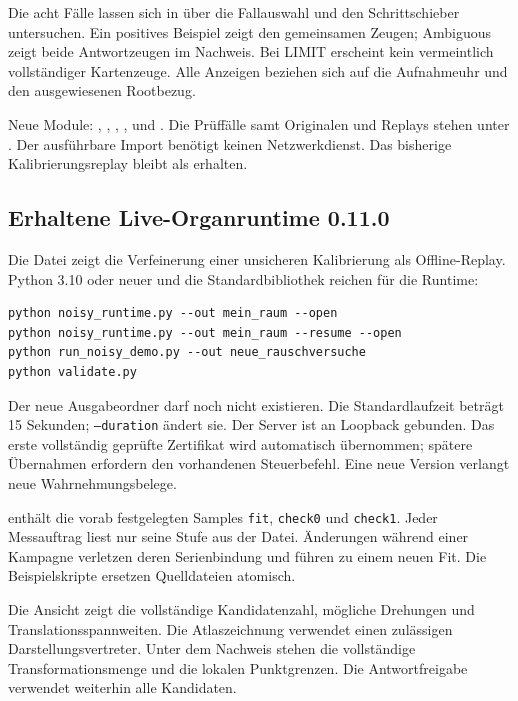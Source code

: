 \documentclass[11pt,a4paper]{article}
\begin{document}
Die acht Fälle lassen sich in  über die
Fallauswahl und den Schrittschieber untersuchen. Ein positives
Beispiel zeigt den gemeinsamen Zeugen; Ambiguous zeigt beide
Antwortzeugen im Nachweis. Bei LIMIT erscheint kein vermeintlich
vollständiger Kartenzeuge. Alle Anzeigen beziehen sich auf die
Aufnahmeuhr und den ausgewiesenen Rootbezug.

Neue Module: , ,
, ,
 und .
Die Prüffälle samt Originalen und Replays stehen unter
. Der ausführbare Import benötigt keinen
Netzwerkdienst. Das bisherige Kalibrierungsreplay bleibt als
 erhalten.

\clearpage\subsection{Erhaltene Live-Organruntime 0.11.0}
Die Datei  zeigt die Verfeinerung einer unsicheren
Kalibrierung als Offline-Replay. Python 3.10 oder neuer und die
Standardbibliothek reichen für die Runtime:
\begin{lstlisting}
python noisy_runtime.py --out mein_raum --open
python noisy_runtime.py --out mein_raum --resume --open
python run_noisy_demo.py --out neue_rauschversuche
python validate.py
\end{lstlisting}
Der neue Ausgabeordner darf noch nicht existieren. Die Standardlaufzeit
beträgt 15 Sekunden; \texttt{--duration} ändert sie. Der Server ist
an Loopback gebunden. Das erste vollständig geprüfte Zertifikat wird
automatisch übernommen; spätere Übernahmen erfordern den vorhandenen
Steuerbefehl. Eine neue Version verlangt neue Wahrnehmungsbelege.

 enthält die vorab festgelegten Samples
\texttt{fit}, \texttt{check0} und \texttt{check1}. Jeder Messauftrag
liest nur seine Stufe aus der Datei. Änderungen während einer
Kampagne verletzen deren Serienbindung und führen zu einem neuen Fit.
Die Beispielskripte ersetzen Quelldateien atomisch.

Die Ansicht zeigt die vollständige Kandidatenzahl, mögliche Drehungen
und Translationsspannweiten. Die Atlaszeichnung verwendet einen
zulässigen Darstellungsvertreter. Unter dem Nachweis stehen die
vollständige Transformationsmenge und die lokalen Punktgrenzen.
Die Antwortfreigabe verwendet weiterhin alle Kandidaten.
\end{document}
